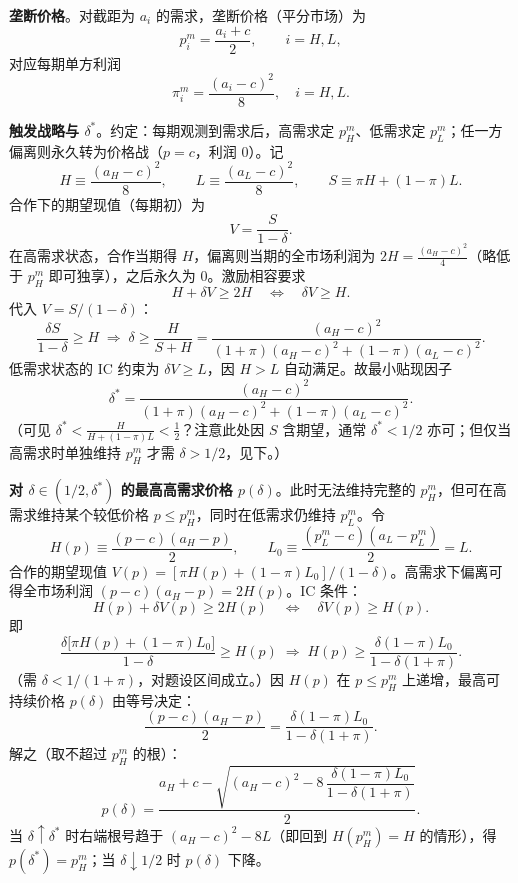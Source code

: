 \sol
\textbf{垄断价格}。对截距为 $a_i$ 的需求，垄断价格（平分市场）为
\[
p_i^m=\frac{a_i+c}{2},\qquad i=H,L,
\]\indent
对应每期单方利润
\[
\pi_i^m=\frac{(a_i-c)^2}{8},\quad i=H,L.
\]

\textbf{触发战略与 $\delta^*$}。约定：每期观测到需求后，高需求定 $p_H^m$、低需求定 $p_L^m$；任一方偏离则永久转为价格战（$p=c$，利润 $0$）。记
\[
H\equiv \frac{(a_H-c)^2}{8},\qquad L\equiv \frac{(a_L-c)^2}{8},\qquad
S\equiv \pi H+(1-\pi)L.
\]\indent
合作下的期望现值（每期初）为
\[
V=\frac{S}{1-\delta}.
\]\indent
在高需求状态，合作当期得 $H$，偏离则当期的全市场利润为 $2H=\frac{(a_H-c)^2}{4}$（略低于 $p_H^m$ 即可独享），之后永久为 $0$。激励相容要求
\[
H+\delta V\ge 2H\quad\Longleftrightarrow\quad \delta V\ge H.
\]\indent
代入 $V=S/(1-\delta)$：
\[
\frac{\delta S}{1-\delta}\ge H
\;\Longrightarrow\;
\delta\ge \frac{H}{S+H}
=\frac{(a_H-c)^2}{(1+\pi)(a_H-c)^2+(1-\pi)(a_L-c)^2}.
\]\indent
低需求状态的 IC 约束为 $\delta V\ge L$，因 $H>L$ 自动满足。故最小贴现因子
\[
\boxed{\delta^*=\frac{(a_H-c)^2}{(1+\pi)(a_H-c)^2+(1-\pi)(a_L-c)^2}}.
\]\indent
（可见 $\delta^*<\frac{H}{H+(1-\pi)L}<\frac12$？注意此处因 $S$ 含期望，通常 $\delta^*<1/2$ 亦可；但仅当高需求时单独维持 $p_H^m$ 才需 $\delta>1/2$，见下。）

\textbf{对 $\delta\in(1/2,\delta^*)$ 的最高高需求价格 $p(\delta)$}。此时无法维持完整的 $p_H^m$，但可在高需求维持某个较低价格 $p\le p_H^m$，同时在低需求仍维持 $p_L^m$。令
\[
H(p)\equiv\frac{(p-c)(a_H-p)}{2},\qquad
L_0\equiv\frac{(p_L^m-c)(a_L-p_L^m)}{2}=L.
\]\indent
合作的期望现值 $V(p)=[\pi H(p)+(1-\pi)L_0]/(1-\delta)$。高需求下偏离可得全市场利润 $(p-c)(a_H-p)=2H(p)$。IC 条件：
\[
H(p)+\delta V(p)\ge 2H(p)\quad\Longleftrightarrow\quad \delta V(p)\ge H(p).
\]\indent
即
\[
\frac{\delta\bigl[\pi H(p)+(1-\pi)L_0\bigr]}{1-\delta}\ge H(p)
\;\Longrightarrow\;
H(p)\ge \frac{\delta(1-\pi)L_0}{1-\delta(1+\pi)}.
\]\indent
（需 $\delta<1/(1+\pi)$，对题设区间成立。）因 $H(p)$ 在 $p\le p_H^m$ 上递增，最高可持续价格 $p(\delta)$ 由等号决定：
\[
\frac{(p-c)(a_H-p)}{2}=\frac{\delta(1-\pi)L_0}{1-\delta(1+\pi)}.
\]\indent
解之（取不超过 $p_H^m$ 的根）：
\[
\boxed{
p(\delta)=\frac{a_H+c-\sqrt{(a_H-c)^2-8\,\dfrac{\delta(1-\pi)L_0}{1-\delta(1+\pi)}}}{2}
}.
\]\indent
当 $\delta\uparrow\delta^*$ 时右端根号趋于 $(a_H-c)^2-8L$（即回到 $H(p_H^m)=H$ 的情形），得 $p(\delta^*)=p_H^m$；当 $\delta\downarrow 1/2$ 时 $p(\delta)$ 下降。

